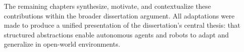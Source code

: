 The remaining chapters synthesize, motivate, and contextualize these contributions within the broader dissertation argument. All adaptations were made to produce a unified presentation of the dissertation's central thesis: that structured abstractions enable autonomous agents and robots to adapt and generalize in open-world environments.
